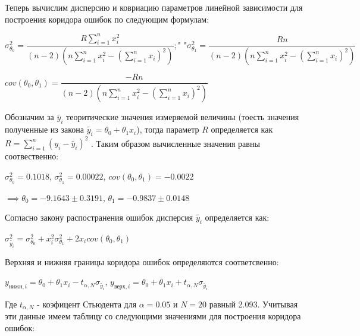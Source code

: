 \documentclass[a4paper, 12pt]{article}
\begin{document}
	\quad Теперь вычислим дисперсию и ковриацию параметров линейной зависимости для построения коридора ошибок по следующим формулам:
	
	\begin{center}
		$\sigma_{\theta_0}^2 = \dfrac{R\sum \limits_{i=1}^{n} x_i^2}{(n-2) \left( n \sum \limits_{i=1}^{n} x_i^2 - \left( \sum \limits_{i=1}^{n} x_i \right)^2 \right) }; \text{" "} \sigma_{\theta_1}^2 = \dfrac{Rn}{(n-2) \left( n \sum \limits_{i=1}^{n} x_i^2 - \left( \sum \limits_{i=1}^{n} x_i \right)^2 \right) }$ 
		
		$ cov(\theta_0, \theta_1) = \dfrac{-Rn}{(n-2) \left( n \sum \limits_{i=1}^{n} x_i^2 - \left( \sum \limits_{i=1}^{n} x_i \right)^2 \right) } $
		
	\end{center}
	
	\quad Обозначим за $\tilde{y_i} $ теоритические значения измеряемой величины (тоесть значения полученные из закона $\tilde{y_i} = \theta_0 + \theta_1 x_i$), тогда параметр $R$ определяется как $R = \sum \limits_{i=1}^{n} (y_i - \tilde{y_i})^2 $ . Таким образом вычисленные значения равны соотвественно:
	
	\begin{center}
		$\sigma^2_{\theta_0} = 0.1018$, $\sigma^2_{\theta_1} = 0.00022$, $cov(\theta_0, \theta_1) = -0.0022$
		
		$\implies \theta_0 =-9.1643 \pm 0.3191$, $\theta_1 = -0.9837 \pm 0. 0148 $
	\end{center}
	
	\quad Согласно закону распостранения ошибок дисперсия $\tilde{y_i}$ определяется как:
	
	\begin{center}
		$\sigma^2_{\tilde{y_i}} = \sigma_{\theta_0}^2 + x_{i}^2\sigma_{\theta_1}^2 + 2x_i cov(\theta_0, \theta_1) $
	\end{center}
	
	\quad  Верхняя и нижняя границы коридора ошибок определяются соответсвенно:
	
	\begin{center}
		$  y_{\text{нижн}, i}= \theta_0 + \theta_1 x_i - t_{\alpha, N} \sigma_{\tilde{y_i}}$, $y_{\text{верх}, i} = \theta_0 + \theta_1 x_i + t_{\alpha, N} \sigma_{\tilde{y_i}}$
	\end{center}
	
	\quad Где $t_{\alpha, N}$ - коэфицент Стьюдента для $\alpha = 0.05$ и $N = 20$ равный 2.093. Учитывая эти данные имеем таблицу со следующими значениями для построения коридора ошибок:
	
\end{document}

